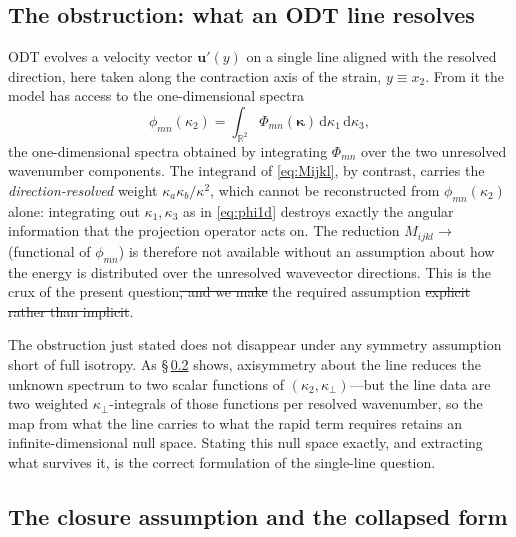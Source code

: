 \documentclass[lineno]{JFM-FLM_Au}
\newcounter{assumption}
\providecommand{\DIFadd}[1]{{\protect\color{blue}\uwave{#1}}} %
\providecommand{\DIFdel}[1]{{\protect\color{red}\sout{#1}}} %
\providecommand{\DIFaddbegin}{} %
\providecommand{\DIFaddend}{} %
\providecommand{\DIFdelbegin}{} %
\providecommand{\DIFdelend}{} %
\begin{document}
\subsection{The obstruction: what an ODT line resolves}\label{sec:obstruction}

ODT evolves a velocity vector $\boldsymbol{u}'(y)$ on a single line aligned
with the resolved direction, here taken along the contraction axis of the
strain, $y\equiv x_2$. From it the model has access to the one-dimensional
spectra
\begin{equation}
  \phi_{mn}(\kappa_2)
  = \int_{\mathbb{R}^2}
      \Phi_{mn}(\boldsymbol{\kappa})\,
      \mathrm{d}\kappa_1\,\mathrm{d}\kappa_3,
  \label{eq:phi1d}
\end{equation}
the one-dimensional spectra obtained by integrating $\Phi_{mn}$ over the two
unresolved wavenumber components. The integrand of \eqref{eq:Mijkl}, by
contrast, carries the \emph{direction-resolved} weight
$\kappa_a\kappa_b/\kappa^2$, which cannot be reconstructed from
$\phi_{mn}(\kappa_2)$ alone: integrating out $\kappa_1,\kappa_3$ as in
\eqref{eq:phi1d} destroys exactly the angular information that the projection
operator acts on. The reduction $M_{ijkl}\!\to\!$ (functional of
$\phi_{mn}$) is therefore not available without an assumption about how the
energy is distributed over the unresolved wavevector directions. This is the crux of the present question\DIFdelbegin \DIFdel{, and we make }\DIFdelend \DIFaddbegin \DIFadd{; we state }\DIFaddend the required assumption \DIFdelbegin \DIFdel{explicit
rather than implicit}\DIFdelend \DIFaddbegin \DIFadd{explicitly}\DIFaddend .

The obstruction just stated does not disappear under any symmetry
assumption short of full isotropy. As \S\,\ref{sec:assumption} shows,
axisymmetry about the line reduces the unknown spectrum to two scalar
functions of $(\kappa_2,\kappa_\perp)$---but the line data are two weighted
$\kappa_\perp$-integrals of those functions per resolved wavenumber, so the
map from what the line carries to what the rapid term requires retains an
infinite-dimensional null space. Stating this null space exactly, and
extracting what survives it, is the correct formulation of the single-line
question.

\subsection{The closure assumption and the collapsed form}
\label{sec:assumption}
\end{document}
